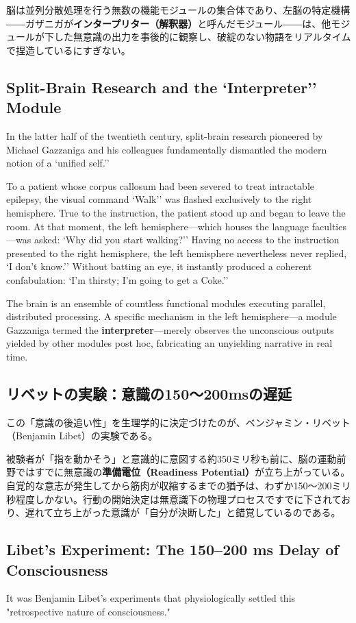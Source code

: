     脳は並列分散処理を行う無数の機能モジュールの集合体であり、左脳の特定機構――ガザニガが\textbf{インタープリター（解釈器）}と呼んだモジュール――は、他モジュールが下した無意識の出力を事後的に観察し、破綻のない物語をリアルタイムで捏造しているにすぎない。
\else
    \subsection{Split-Brain Research and the `Interpreter'' Module} In the latter half of the twentieth century, split-brain research pioneered by Michael Gazzaniga and his colleagues fundamentally dismantled the modern notion of a `unified self.''

    To a patient whose corpus callosum had been severed to treat intractable epilepsy, the visual command `Walk'' was flashed exclusively to the right hemisphere. True to the instruction, the patient stood up and began to leave the room. At that moment, the left hemisphere—which houses the language faculties—was asked: `Why did you start walking?'' Having no access to the instruction presented to the right hemisphere, the left hemisphere nevertheless never replied, `I don't know.'' Without batting an eye, it instantly produced a coherent confabulation: `I'm thirsty; I'm going to get a Coke.''

    The brain is an ensemble of countless functional modules executing parallel, distributed processing. A specific mechanism in the left hemisphere—a module Gazzaniga termed the \textbf{interpreter}—merely observes the unconscious outputs yielded by other modules post hoc, fabricating an unyielding narrative in real time.    
\fi

\ifja
    \subsection{リベットの実験：意識の150〜200msの遅延}
    この「意識の後追い性」を生理学的に決定づけたのが、ベンジャミン・リベット（Benjamin Libet）の実験である。

    被験者が「指を動かそう」と意識的に意図する約350ミリ秒も前に、脳の運動前野ではすでに無意識の\textbf{準備電位（Readiness Potential）}が立ち上がっている。自覚的な意志が発生してから筋肉が収縮するまでの猶予は、わずか150〜200ミリ秒程度しかない。行動の開始決定は無意識下の物理プロセスですでに下されており、遅れて立ち上がった意識が「自分が決断した」と錯覚しているのである。
\else
    \subsection{Libet's Experiment: The 150--200 ms Delay of Consciousness}
    It was Benjamin Libet's experiments that physiologically settled this "retrospective nature of consciousness."

